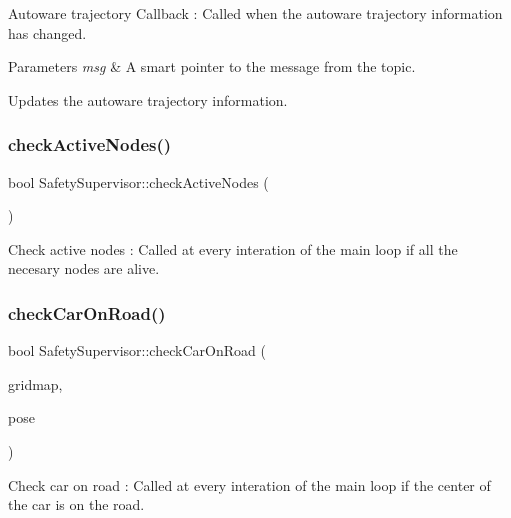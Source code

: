 Autoware trajectory Callback \+: Called when the autoware trajectory information has changed. 


\begin{DoxyParams}{Parameters}
{\em msg} & A smart pointer to the message from the topic.\\
\hline
\end{DoxyParams}
Updates the autoware trajectory information. \mbox{\label{classSafetySupervisor_a2a54494d111ce7ff71ab833870821646}} 
\subsubsection{\texorpdfstring{check\+Active\+Nodes()}{checkActiveNodes()}}
{\footnotesize\ttfamily bool Safety\+Supervisor\+::check\+Active\+Nodes (\begin{DoxyParamCaption}{ }\end{DoxyParamCaption})\hspace{0.3cm}{\ttfamily [inline]}}



Check active nodes \+: Called at every interation of the main loop  if all the necesary nodes are alive. 

\mbox{\label{classSafetySupervisor_a268efed56af884faef112eb0e93baa72}} 
\subsubsection{\texorpdfstring{check\+Car\+On\+Road()}{checkCarOnRoad()}}
{\footnotesize\ttfamily bool Safety\+Supervisor\+::check\+Car\+On\+Road (\begin{DoxyParamCaption}\item[{const grid\+\_\+map\+::\+Grid\+Map \&}]{gridmap,  }\item[{const geometry\+\_\+msgs\+::\+Pose \&}]{pose }\end{DoxyParamCaption})\hspace{0.3cm}{\ttfamily [inline]}}



Check car on road \+: Called at every interation of the main loop  if the center of the car is on the road. 

